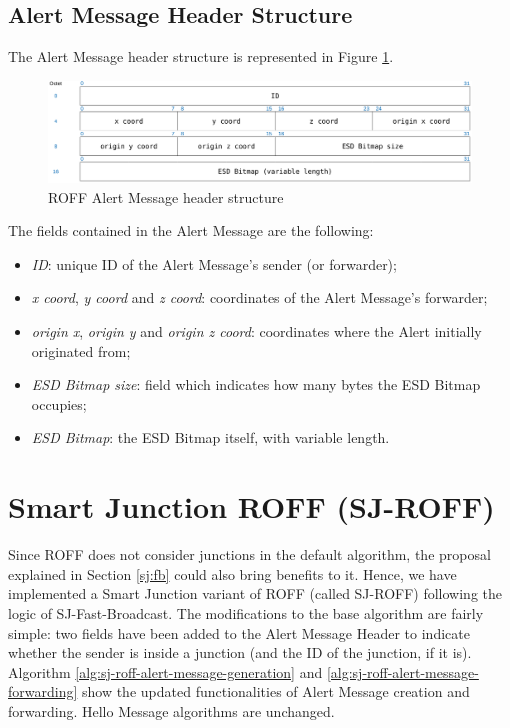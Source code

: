 		\subsection{Alert Message Header Structure}
			The Alert Message header structure is represented in Figure \ref{fig:roffAlertHeader}.
			
			\begin{figure}[H]
				\centering
				\includegraphics[width=\textwidth]{immagini/roffAlertHeader}
				\caption{ROFF Alert Message header structure}
				\label{fig:roffAlertHeader}
			\end{figure}
			
			The fields contained in the Alert Message are the following:
			\begin{itemize}
				\item \textit{ID}: unique ID of the Alert Message's sender (or forwarder);
				\item \textit{x coord}, \textit{y coord} and \textit{z coord}: coordinates of the Alert Message's forwarder;
				\item \textit{origin x}, \textit{origin y} and \textit{origin z coord}: coordinates where the Alert initially originated from;
				\item \textit{ESD Bitmap size}: field which indicates how many bytes the ESD Bitmap occupies;
				\item \textit{ESD Bitmap}: the ESD Bitmap itself, with variable length.
			\end{itemize}
	
	\section{Smart Junction ROFF (SJ-ROFF)}
		Since ROFF does not consider junctions in the default algorithm, the proposal explained in Section \ref{sj:fb} could also bring benefits to it. Hence, we have implemented a Smart Junction variant of ROFF (called SJ-ROFF) following the logic of SJ-Fast-Broadcast. The modifications to the base algorithm are fairly simple: two fields have been added to the Alert Message Header to indicate whether the sender is inside a junction (and the ID of the junction, if it is). Algorithm \ref{alg:sj-roff-alert-message-generation} and \ref{alg:sj-roff-alert-message-forwarding} show the updated functionalities of Alert Message creation and forwarding. Hello Message algorithms are unchanged.
		
